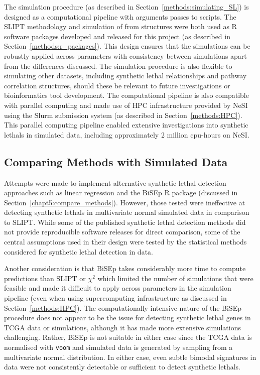 The simulation procedure (as described in Section~\ref{methods:simulating_SL}) is designed as a computational pipeline with arguments passes to scripts. The \gls{SLIPT} methodology and simulation of  from  structures were both used as R \citep{R_core} software packages developed and released for this project (as described in Section~\ref{methods:r_packages}). This design ensures that the simulations can be robustly applied across parameters with consistency between simulations apart from the differences discussed. The simulation procedure is also flexible to simulating other datasets, including \gls{synthetic lethal} relationships and pathway correlation structures, should these be relevant to future investigations or \gls{bioinformatics} tool development. The computational pipeline is also compatible with parallel computing and made use of \gls{HPC} infrastructure provided by \gls{NeSI} using the \gls{Slurm} submission system (as described in Section~\ref{methods:HPC}). This parallel computing pipeline enabled extensive investigations into \glspl{synthetic lethal} in simulated data, including approximately 2 million cpu-hours on \gls{NeSI}. 


\subsection{Comparing Methods with Simulated Data}

Attempts were made to implement alternative \gls{synthetic lethal} detection approaches such as linear regression and the \gls{BiSEp} R package (discussed in Section~\ref{chapt5:compare_methods}). However, those tested were ineffective at detecting \glspl{synthetic lethal} in multivariate normal simulated data in comparison to \gls{SLIPT}. While some of the published \gls{synthetic lethal} detection methods \citep{Jerby2014, Lu2015} did not provide reproducible software releases for direct comparison, some of the central assumptions used in their design were tested by the statistical methods considered for \gls{synthetic lethal} detection in  data.  

Another consideration is that \gls{BiSEp} takes considerably more time to compute predictions than \gls{SLIPT} or $\chi^2$ which limited the number of simulations that were feasible and made it difficult to apply across parameters in the simulation pipeline (even when using supercomputing infrastructure as discussed in Section~\ref{methods:HPC}). The computationally intensive nature of the \gls{BiSEp} procedure does not appear to be the issue for detecting \gls{synthetic lethal} genes in \gls{TCGA} data or simulations, although it has made more extensive simulations challenging. Rather, \gls{BiSEp} is not suitable in either case since the \gls{TCGA} data is normalised with \texttt{voom} \citep{limma} and simulated data is generated by sampling from a multivariate normal distribution. In either case, even subtle bimodal signatures in  data were not consistently detectable or sufficient to detect \glspl{synthetic lethal}.

